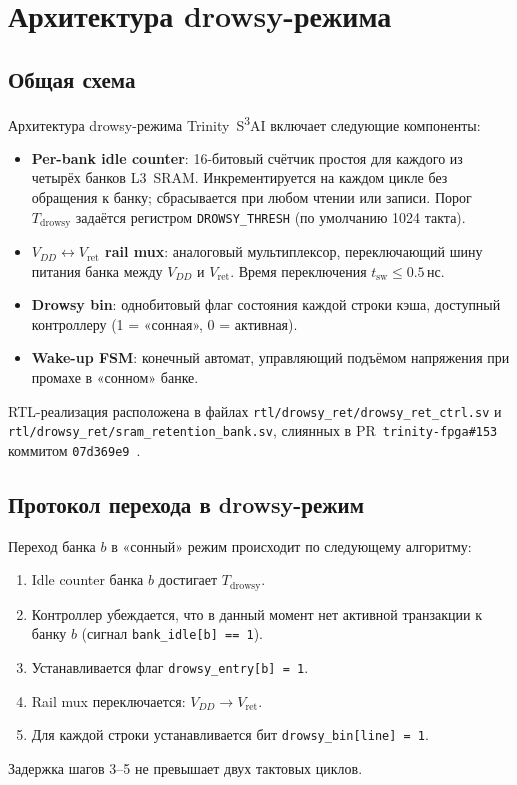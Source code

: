 \section{Архитектура drowsy-режима}
\label{sec:glava89-arch}

\subsection{Общая схема}

Архитектура drowsy-режима Trinity~S\textsuperscript{3}AI
включает следующие компоненты:
%
\begin{itemize}
  \item \textbf{Per-bank idle counter}: 16-битовый счётчик простоя
        для каждого из четырёх банков L3~SRAM.
        Инкрементируется на каждом цикле без обращения к банку;
        сбрасывается при любом чтении или записи.
        Порог $T_\mathrm{drowsy}$ задаётся регистром
        \texttt{DROWSY\_THRESH} (по умолчанию 1024 такта).
  \item \textbf{$V_{DD} \leftrightarrow V_\mathrm{ret}$ rail mux}:
        аналоговый мультиплексор, переключающий шину питания
        банка между $V_{DD}$ и $V_\mathrm{ret}$.
        Время переключения $t_\mathrm{sw} \leq 0.5\,\text{нс}$.
  \item \textbf{Drowsy bin}: однобитовый флаг состояния каждой строки
        кэша, доступный контроллеру (1 = «сонная», 0 = активная).
  \item \textbf{Wake-up FSM}: конечный автомат, управляющий
        подъёмом напряжения при промахе в «сонном» банке.
\end{itemize}
%
RTL-реализация расположена в файлах
\texttt{rtl/drowsy\_ret/drowsy\_ret\_ctrl.sv} и
\texttt{rtl/drowsy\_ret/sram\_retention\_bank.sv},
слиянных в PR~\texttt{trinity-fpga\#153} коммитом \texttt{07d369e9}~\cite{trinityfpga153}.

\subsection{Протокол перехода в drowsy-режим}

Переход банка $b$ в «сонный» режим происходит по следующему алгоритму:
\begin{enumerate}
  \item Idle counter банка $b$ достигает $T_\mathrm{drowsy}$.
  \item Контроллер убеждается, что в данный момент нет
        активной транзакции к банку $b$ (сигнал \texttt{bank\_idle[b]~==~1}).
  \item Устанавливается флаг \texttt{drowsy\_entry[b]~=~1}.
  \item Rail mux переключается: $V_{DD} \rightarrow V_\mathrm{ret}$.
  \item Для каждой строки устанавливается бит \texttt{drowsy\_bin[line]~=~1}.
\end{enumerate}
Задержка шагов 3--5 не превышает двух тактовых циклов.

